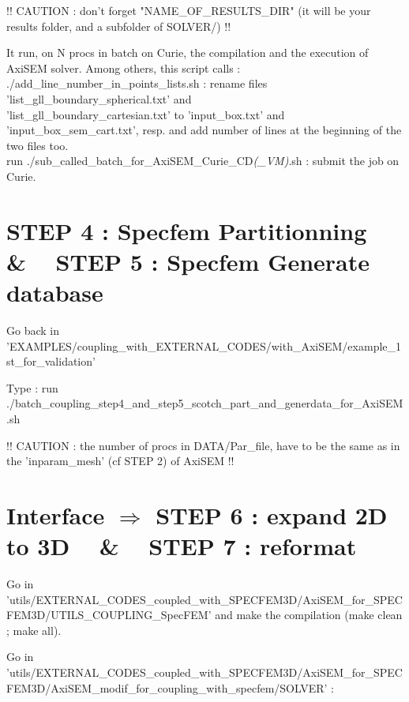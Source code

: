 \documentclass[11pt]{article}
\begin{document}
\noindent !! CAUTION : don't forget "NAME\_OF\_RESULTS\_DIR" (it will be your results folder, and a subfolder of SOLVER/) !!

\smallskip

\noindent It run, on N procs in batch on Curie, the compilation and the execution of  AxiSEM solver.
Among others, this script calls : \\

\noindent ./add\_line\_number\_in\_points\_lists.sh : rename files 'list\_gll\_boundary\_spherical.txt' and \\ 'list\_gll\_boundary\_cartesian.txt' to 'input\_box.txt' and 'input\_box\_sem\_cart.txt', resp. and add number of lines at the beginning of the two files too. \\

\noindent run ./sub\_called\_batch\_for\_AxiSEM\_Curie\_CD\textit{(\_VM)}.sh : submit the job on Curie.


\section{STEP 4 : Specfem Partitionning ~ \& ~ STEP 5 : Specfem Generate database}

\noindent Go back in 'EXAMPLES/coupling\_with\_EXTERNAL\_CODES/with\_AxiSEM/example\_1st\_for\_validation'

\medskip

\noindent Type : run ./batch\_coupling\_step4\_and\_step5\_scotch\_part\_and\_generdata\_for\_AxiSEM.sh

\medskip

\noindent !! CAUTION : the number of procs in DATA/Par\_file, have to be the same as in the 'inparam\_mesh' (cf STEP 2) of AxiSEM !!


\section{Interface $\Longrightarrow$ STEP 6 : expand 2D to 3D ~ \& ~ STEP 7 : reformat}

\noindent Go in {\scriptsize 'utils/EXTERNAL\_CODES\_coupled\_with\_SPECFEM3D/AxiSEM\_for\_SPECFEM3D/UTILS\_COUPLING\_SpecFEM'} and make the compilation (make clean ; make all).

\bigskip

\noindent Go in {\scriptsize 'utils/EXTERNAL\_CODES\_coupled\_with\_SPECFEM3D/AxiSEM\_for\_SPECFEM3D/AxiSEM\_modif\_for\_coupling\_with\_specfem/SOLVER'} :

\medskip
\end{document}
